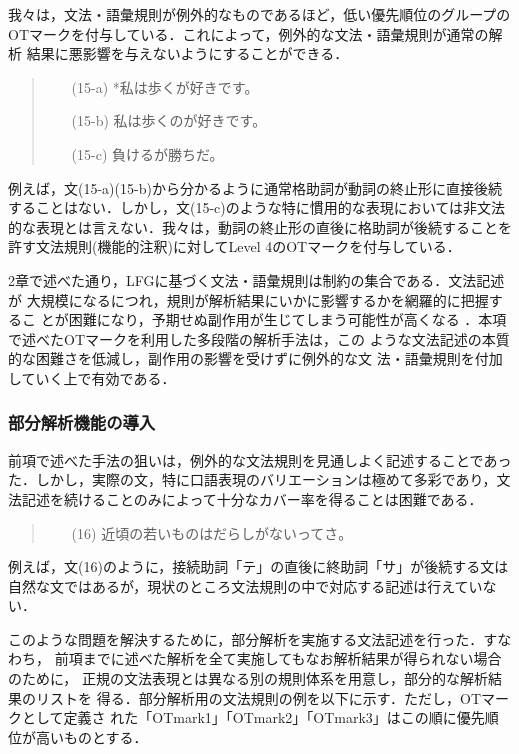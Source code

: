 我々は，文法・語彙規則が例外的なものであるほど，低い優先順位のグループの
OTマークを付与している．これによって，例外的な文法・語彙規則が通常の解析
結果に悪影響を与えないようにすることができる．
\begin{quote}
\begin{itemize}
\item[(15-a)] *私は歩くが好きです。
\item[(15-b)] 私は歩くのが好きです。
\item[(15-c)] 負けるが勝ちだ。
\end{itemize}
\end{quote}
例えば，文(15-a)(15-b)から分かるように通常格助詞が動詞の終止形に直接後続
することはない．しかし，文(15-c)のような特に慣用的な表現においては非文法
的な表現とは言えない．我々は，動詞の終止形の直後に格助詞が後続することを
許す文法規則(機能的注釈)に対してLevel 4のOTマークを付与している．

2章で述べた通り，LFGに基づく文法・語彙規則は制約の集合である．文法記述が
大規模になるにつれ，規則が解析結果にいかに影響するかを網羅的に把握するこ
とが困難になり，予期せぬ副作用が生じてしまう可能性が高くなる
\cite{gunji2000}．本項で述べたOTマークを利用した多段階の解析手法は，この
ような文法記述の本質的な困難さを低減し，副作用の影響を受けずに例外的な文
法・語彙規則を付加していく上で有効である．

\vspace{-2mm}
\subsubsection{部分解析機能の導入}
前項で述べた手法の狙いは，例外的な文法規則を見通しよく記述することであっ
た．しかし，実際の文，特に口語表現のバリエーションは極めて多彩であり，文
法記述を続けることのみによって十分なカバー率を得ることは困難である．
\begin{quote}
\begin{itemize}
\item[(16)] 近頃の若いものはだらしがないってさ。
\end{itemize}
\end{quote}
例えば，文(16)のように，接続助詞「テ」の直後に終助詞「サ」が後続する文は
自然な文ではあるが，現状のところ文法規則の中で対応する記述は行えていない．

このような問題を解決するために，部分解析を実施する文法記述を行った．すなわち，
前項までに述べた解析を全て実施してもなお解析結果が得られない場合のために，
正規の文法表現とは異なる別の規則体系を用意し，部分的な解析結果のリストを
得る．部分解析用の文法規則の例を以下に示す．ただし，OTマークとして定義さ
れた「OTmark1」「OTmark2」「OTmark3」はこの順に優先順位が高いものとする．

